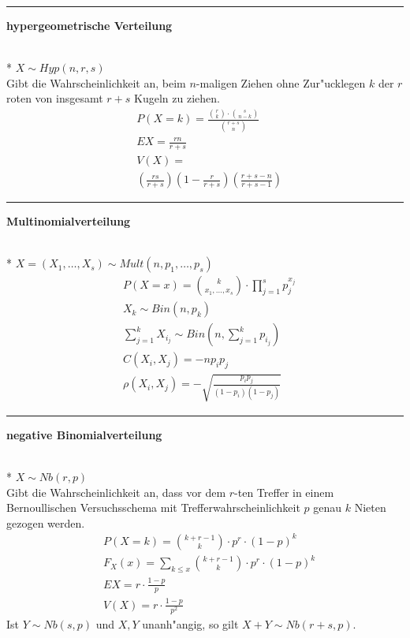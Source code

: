 \documentclass{article}
\newcommand{\hh}[1]{{\vspace{1pt}\hrule\vspace{1pt} \noindent\textbf{#1}}\\*}
\begin{document}
\begin{multicols}{4}
\hh{hypergeometrische Verteilung}
$X\sim Hyp(n,r,s)$\\
Gibt die Wahrscheinlichkeit an, beim $n$-maligen Ziehen ohne Zur"ucklegen $k$ der $r$ roten von insgesamt $r+s$ Kugeln zu ziehen.
\begin{align*}
&P(X=k)=\frac{{r\choose k}\cdot{s\choose n-k}}{{r+s\choose n}}\\
&EX=\frac{rn}{r+s}\\
&V(X)=\\&\left(\frac{rs}{r+s}\right)\left(1-\frac r{r+s}\right)\left(\frac{r+s-n}{r+s-1}\right)
\end{align*}

\hh{Multinomialverteilung}
$X=(X_1,\ldots,X_s)\sim Mult(n, p_1,\ldots,p_s)$
\begin{align*}
&P(X=x)={k\choose x_1,\ldots, x_s}\cdot\prod_{j=1}^s p_j^{x_j}\\
&X_k\sim Bin(n,p_k)\\
&\sum_{j=1}^k X_{i_j}\sim Bin(n,\sum_{j=1}^k p_{i_j})\\
&C(X_i,X_j)=-np_ip_j\\
&\rho(X_i,X_j)=-\sqrt{\frac{p_ip_j}{(1-p_i)(1-p_j)}}
\end{align*}

\hh{negative Binomialverteilung}
$X\sim Nb(r,p)$\\
Gibt die Wahrscheinlichkeit an, dass vor dem $r$-ten Treffer in einem Bernoullischen Versuchsschema mit Trefferwahrscheinlichkeit $p$ genau $k$ Nieten gezogen werden.
\begin{align*}
&P(X=k)={k+r-1\choose k}\cdot p^r\cdot(1-p)^{k}\\
&F_X(x)=\sum_{k\le x}{k+r-1\choose k}\cdot p^r\cdot (1-p)^{k}\\
&EX=r\cdot\frac{1-p}p\\
&V(X)=r\cdot\frac{1-p}{p^2}
\end{align*}
Ist $Y\sim Nb(s,p)$ und $X,Y$ unanh"angig, so gilt $X+Y\sim Nb(r+s,p)$.


\end{multicols}
\end{document}

